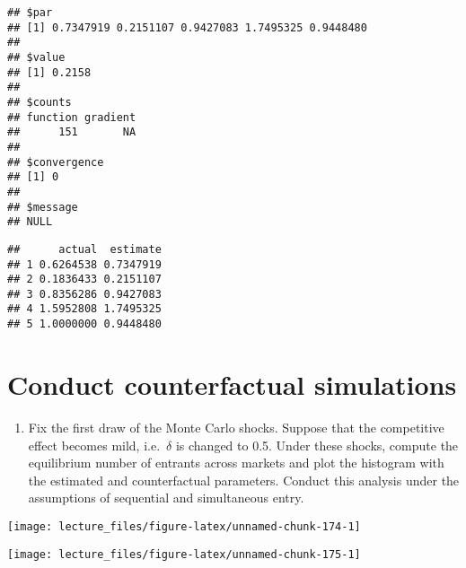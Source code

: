 \documentclass[
]{book}
\newenvironment{Shaded}{\begin{snugshade}}{\end{snugshade}}
\newcommand{\AttributeTok}[1]{\textcolor[rgb]{0.13,0.29,0.53}{#1}}
\newcommand{\FunctionTok}[1]{\textcolor[rgb]{0.13,0.29,0.53}{\textbf{#1}}}
\newcommand{\NormalTok}[1]{#1}
\newcommand{\OtherTok}[1]{\textcolor[rgb]{0.56,0.35,0.01}{#1}}
\newcommand{\SpecialCharTok}[1]{\textcolor[rgb]{0.81,0.36,0.00}{\textbf{#1}}}
\providecommand{\tightlist}{%
  \setlength{\itemsep}{0pt}\setlength{\parskip}{0pt}}
\begin{document}
\begin{verbatim}
## $par
## [1] 0.7347919 0.2151107 0.9427083 1.7495325 0.9448480
## 
## $value
## [1] 0.2158
## 
## $counts
## function gradient 
##      151       NA 
## 
## $convergence
## [1] 0
## 
## $message
## NULL
\end{verbatim}

\begin{Shaded}
\end{Shaded}

\begin{verbatim}
##      actual  estimate
## 1 0.6264538 0.7347919
## 2 0.1836433 0.2151107
## 3 0.8356286 0.9427083
## 4 1.5952808 1.7495325
## 5 1.0000000 0.9448480
\end{verbatim}

\hypertarget{conduct-counterfactual-simulations}{%
\section{Conduct counterfactual simulations}\label{conduct-counterfactual-simulations}}

\begin{enumerate}
\def\labelenumi{\arabic{enumi}.}
\tightlist
\item
  Fix the first draw of the Monte Carlo shocks. Suppose that the competitive effect becomes mild, i.e.~\(\delta\) is changed to 0.5. Under these shocks, compute the equilibrium number of entrants across markets and plot the histogram with the estimated and counterfactual parameters. Conduct this analysis under the assumptions of sequential and simultaneous entry.
\end{enumerate}

\begin{center}\texttt{[image: lecture\_files/figure-latex/unnamed-chunk-174-1]} \end{center}

\begin{center}\texttt{[image: lecture\_files/figure-latex/unnamed-chunk-175-1]} \end{center}
\end{document}
